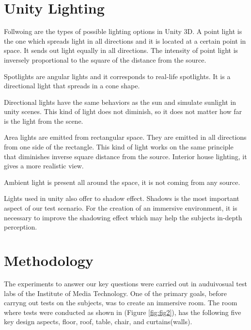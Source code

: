 \section{Unity Lighting}
Follwoing are the types of possible lighting options in Unity 3D.
A point light is the one which spreads light in all directions and it is located at a certain point in space. It sends out light equally in all directions. The intensity of point light is inversely proportional to the square of the distance from the source.\par
Spotlights are angular lights and it corresponds to real-life spotlights. It is a directional light that spreads in a cone shape. \par
Directional lights have the same behaviors as the sun and simulate sunlight in unity scenes. This kind of light does not diminish, so it does not matter how far is the light from the scene.\par 
Area lights are emitted from rectangular space. They are emitted in all directions from one side of the rectangle. This kind of light works on the same principle that diminishes inverse square distance from the source. Interior house lighting, it gives a more realistic view.\par 
Ambient light is present all around the space, it is not coming from any source. \par
Lights used in unity also offer to shadow effect. 
Shadows is the most important aspect of our test scenario. For the creation of an immersive environment, it is necessary to improve the shadowing effect which may help the subjects in-depth perception.

\section{Methodology}
The experiments to answer our key questions were carried out in auduivosual test labs of the Institute of Media Technology. One of the primary goals, before carryng out tests on the subjects, was to create an immersive room. The room where tests were conducted as shown in (Figure \ref{fig:fig2}), has the following five key design aspects, floor, roof, table, chair, and curtains(walls). 

